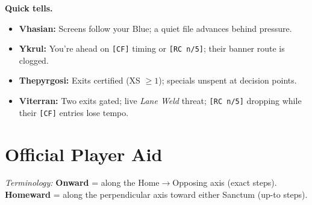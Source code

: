 \documentclass[11pt]{article}
\newcommand{\code}[1]{\texttt{#1}}
\newcommand{\code}[1]{\texttt{#1}}
\begin{document}
\medskip
\noindent\textbf{Quick tells.}
\begin{itemize}[leftmargin=*,itemsep=0.25em]
  \item \textbf{Vhasian:} Screens follow your Blue; a quiet file advances behind pressure.
  \item \textbf{Ykrul:} You’re ahead on \code{[CF]} timing or \code{[RC n/5]}; their banner route is clogged.
  \item \textbf{Thepyrgosi:} Exits certified (XS $\ge 1$); specials unspent at decision points.
  \item \textbf{Viterran:} Two exits gated; live \emph{Lane Weld} threat; \code{[RC n/5]} dropping while their \code{[CF]} entries lose tempo.
\end{itemize}

\clearpage
\appendix
\section{Official Player Aid}
\label{sec:playeraide}


\noindent\footnotesize\emph{Terminology:} \textbf{Onward} = along the Home$\to$Opposing axis (exact steps). \textbf{Homeward} = along the perpendicular axis toward either Sanctum (up-to steps).\normalsize

\end{document}
